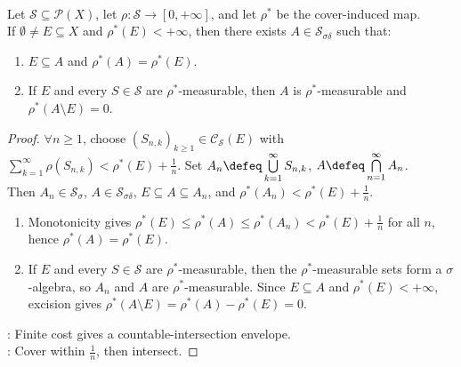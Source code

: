 \begin{proposition} \label{prop:finite-outer-measure-sigma-delta-envelope} \\
Let $\mathcal{S}\subseteq\mathcal{P}(X)$, let $\rho:\mathcal{S}\to[0,+\infty]$, and let $\rho^\ast$ be the cover-induced map.\\
If $\emptyset\neq E\subseteq X$ and $\rho^\ast(E)<+\infty$, then there exists $A\in\mathcal{S}_{\sigma\delta}$ such that:
\begin{enumerate}[label=(\roman*)]
\setlength{\itemsep}{0pt}
\item $E\subseteq A$ and $\rho^\ast(A)=\rho^\ast(E)$.
\item If $E$ and every $S\in\mathcal{S}$ are $\rho^\ast$-measurable, then $A$ is $\rho^\ast$-measurable and $\rho^\ast(A\setminus E)=0$.
\end{enumerate}
\begin{proof} $\forall n\geq1$, choose $(S_{n,k})_{k\geq1}\in\mathcal{C}_{\mathcal{S}}(E)$ with $\sum\limits_{k=1}^{\infty}\rho(S_{n,k})<\rho^\ast(E)+\frac{1}{n}$. Set $A_n\defeq\bigcup\limits_{k=1}^{\infty}S_{n,k}$, $A\defeq\bigcap\limits_{n=1}^{\infty}A_n$.\\
Then $A_n\in\mathcal{S}_\sigma$, $A\in\mathcal{S}_{\sigma\delta}$, $E\subseteq A\subseteq A_n$, and $\rho^\ast(A_n)<\rho^\ast(E)+\frac{1}{n}$.
\begin{enumerate}[label=(\roman*)]
\setlength{\itemsep}{0pt}
\item Monotonicity gives $\rho^\ast(E)\leq\rho^\ast(A)\leq\rho^\ast(A_n)<\rho^\ast(E)+\frac{1}{n}$ for all $n$, hence $\rho^\ast(A)=\rho^\ast(E)$.
\item If $E$ and every $S\in\mathcal{S}$ are $\rho^\ast$-measurable, then the $\rho^\ast$-measurable sets form a $\sigma$-algebra, so $A_n$ and $A$ are $\rho^\ast$-measurable. Since $E\subseteq A$ and $\rho^\ast(E)<+\infty$, excision gives $\rho^\ast(A\setminus E)=\rho^\ast(A)-\rho^\ast(E)=0$.
\end{enumerate}
: Finite cost gives a countable-intersection envelope.\\
: Cover within $\frac{1}{n}$, then intersect.
\end{proof}
\end{proposition}

